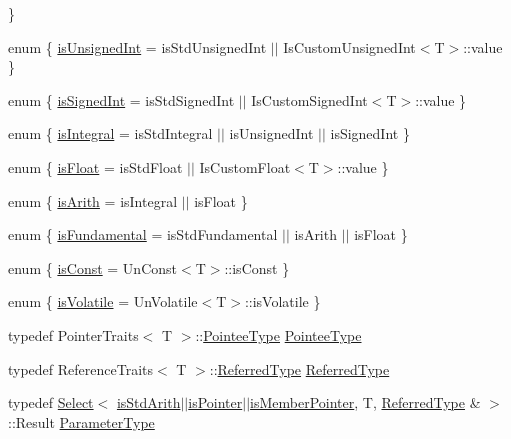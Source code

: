 \begin{DoxyCompactItemize}
 \}
\item 
enum \{ \mbox{\hyperlink{classUtil_1_1TypeTraits_acc7cc813299fef607c83811df9588ceaa491d7fd4750cb0d1a2dcbeb5fc3456d1}{is\+Unsigned\+Int}} = is\+Std\+Unsigned\+Int $\vert$$\vert$ Is\+Custom\+Unsigned\+Int$<$T$>$\+:\+:value
 \}
\item 
enum \{ \mbox{\hyperlink{classUtil_1_1TypeTraits_a04632ebd2ca449c48e23e0467e6dc286a238eb902c14c6c61c1f4baa46e56c461}{is\+Signed\+Int}} = is\+Std\+Signed\+Int $\vert$$\vert$ Is\+Custom\+Signed\+Int$<$T$>$\+:\+:value
 \}
\item 
enum \{ \mbox{\hyperlink{classUtil_1_1TypeTraits_acc1045f8d39d125327d6ad2144e39a8eae3cb8ddfe928cd1a6dc3438e54a5b74f}{is\+Integral}} = is\+Std\+Integral $\vert$$\vert$ is\+Unsigned\+Int $\vert$$\vert$ is\+Signed\+Int
 \}
\item 
enum \{ \mbox{\hyperlink{classUtil_1_1TypeTraits_adba440f389541bf50f3736debd287d65a53a8c88c40192f095328053a89109888}{is\+Float}} = is\+Std\+Float $\vert$$\vert$ Is\+Custom\+Float$<$T$>$\+:\+:value
 \}
\item 
enum \{ \mbox{\hyperlink{classUtil_1_1TypeTraits_aa35f9ee9d04f8b1c491eac22685dabb4aacdb8f6332a550ea4ebaf1ff8014b127}{is\+Arith}} = is\+Integral $\vert$$\vert$ is\+Float
 \}
\item 
enum \{ \mbox{\hyperlink{classUtil_1_1TypeTraits_ab8ba17bb86fae2a10f356361d4f6c039a20a90cf2934e5a2c26599d7f051f8675}{is\+Fundamental}} = is\+Std\+Fundamental $\vert$$\vert$ is\+Arith $\vert$$\vert$ is\+Float
 \}
\item 
enum \{ \mbox{\hyperlink{classUtil_1_1TypeTraits_a8f4cf7205afba81db1668e605717f20da26a0a78aeec8fa5c5c02c774b73585cd}{is\+Const}} = Un\+Const$<$T$>$\+:\+:is\+Const
 \}
\item 
enum \{ \mbox{\hyperlink{classUtil_1_1TypeTraits_ab61557d85a3434ad5979526955075371ad832c3ecd956e173f499202b8a249453}{is\+Volatile}} = Un\+Volatile$<$T$>$\+:\+:is\+Volatile
 \}
\item 
typedef Pointer\+Traits$<$ T $>$\+::\mbox{\hyperlink{classUtil_1_1TypeTraits_aa964d0cd9ee331e0d2d814a33bb93614}{Pointee\+Type}} \mbox{\hyperlink{classUtil_1_1TypeTraits_aa964d0cd9ee331e0d2d814a33bb93614}{Pointee\+Type}}
\item 
typedef Reference\+Traits$<$ T $>$\+::\mbox{\hyperlink{classUtil_1_1TypeTraits_a89aec1a9db97b7f70e59b6738c5df4f9}{Referred\+Type}} \mbox{\hyperlink{classUtil_1_1TypeTraits_a89aec1a9db97b7f70e59b6738c5df4f9}{Referred\+Type}}
\item 
typedef \mbox{\hyperlink{structUtil_1_1Select}{Select}}$<$ \mbox{\hyperlink{classUtil_1_1TypeTraits_abfcd1f4b7a5011b6ea8b965d1b46e54ea3017f19abc6084d7e144891aaf5adb0f}{is\+Std\+Arith}}$\vert$$\vert$\mbox{\hyperlink{classUtil_1_1TypeTraits_ad589492a3d9a9a4fd5154de3efb032c1a0813f58ed7af0a00a07d0ba641cc3bba}{is\+Pointer}}$\vert$$\vert$\mbox{\hyperlink{classUtil_1_1TypeTraits_aee8735f108bb235c2d59b8b823e04086abe04caa758890fee25930d96123265d2}{is\+Member\+Pointer}}, T, \mbox{\hyperlink{classUtil_1_1TypeTraits_a89aec1a9db97b7f70e59b6738c5df4f9}{Referred\+Type}} \& $>$\+::Result \mbox{\hyperlink{classUtil_1_1TypeTraits_a36b64fb2fc53ff32a8465e8862632db6}{Parameter\+Type}}

\end{DoxyCompactItemize}
